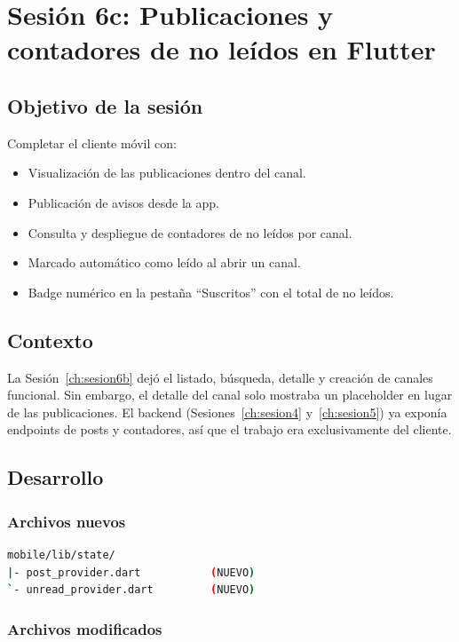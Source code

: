 \chapter{Sesión 6c: Publicaciones y contadores de no leídos en Flutter}
\label{ch:sesion6c}

\section{Objetivo de la sesión}

Completar el cliente móvil con:

\begin{itemize}[leftmargin=*]
  \item Visualización de las publicaciones dentro del canal.
  \item Publicación de avisos desde la app.
  \item Consulta y despliegue de contadores de no leídos por canal.
  \item Marcado automático como leído al abrir un canal.
  \item Badge numérico en la pestaña ``Suscritos'' con el total de no leídos.
\end{itemize}

\section{Contexto}

La Sesión~\ref{ch:sesion6b} dejó el listado, búsqueda, detalle y creación de canales funcional. Sin embargo, el detalle del canal solo mostraba un placeholder en lugar de las publicaciones. El backend (Sesiones~\ref{ch:sesion4} y~\ref{ch:sesion5}) ya exponía endpoints de posts y contadores, así que el trabajo era exclusivamente del cliente.

\section{Desarrollo}

\subsection{Archivos nuevos}

\begin{lstlisting}[language=bash]
mobile/lib/state/
|- post_provider.dart           (NUEVO)
`- unread_provider.dart         (NUEVO)
\end{lstlisting}

\subsection{Archivos modificados}

